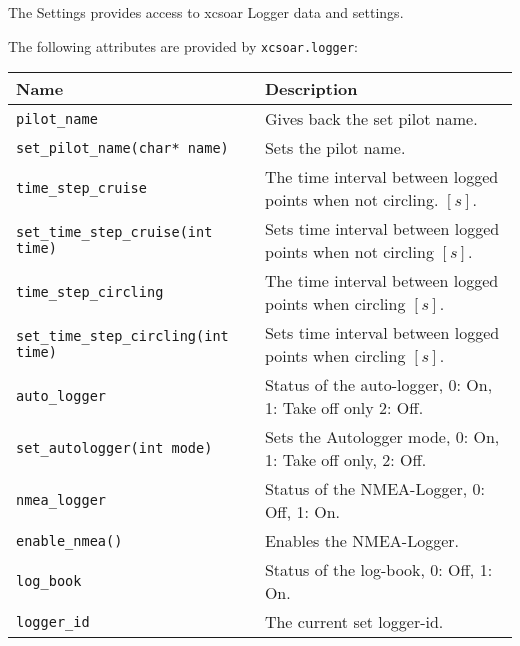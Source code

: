 The Settings provides access to xcsoar Logger data and settings.

The following attributes are provided by \verb|xcsoar.logger|:

\begin{maxipage}
\begin{tabularx}{1.9\textwidth}{l|X}
Name & Description \\
\hline\hline

\verb|pilot_name| & Gives back the set pilot name.\\

\hline

\verb|set_pilot_name(char* name)| &  Sets the pilot name.\\

\hline

\verb|time_step_cruise| & The time interval between logged 
points when not circling. $[s]$.\\

\hline

\verb|set_time_step_cruise(int time)| &  Sets time interval between logged 
points when not circling $[s]$.\\

\hline

\verb|time_step_circling| &  The time interval between logged 
points when circling $[s]$.\\

\hline

\verb|set_time_step_circling(int time)| &  Sets time interval between logged 
points when circling $[s]$.\\

\hline

\verb|auto_logger| &  Status of the auto-logger, 0: On, 1: Take off only
2: Off.\\

\hline

\verb|set_autologger(int mode)| &  Sets the Autologger mode, 0: On,
1: Take off only, 2: Off.\\

\hline

\verb|nmea_logger| &  Status of the NMEA-Logger, 0: Off, 1: On.\\

\hline

\verb|enable_nmea()| &  Enables the NMEA-Logger.\\

\hline

\verb|log_book| &  Status of the log-book, 0: Off, 1: On.\\

\hline

\verb|logger_id| &  The current set logger-id.\\

\end{tabularx}
\end{maxipage}


